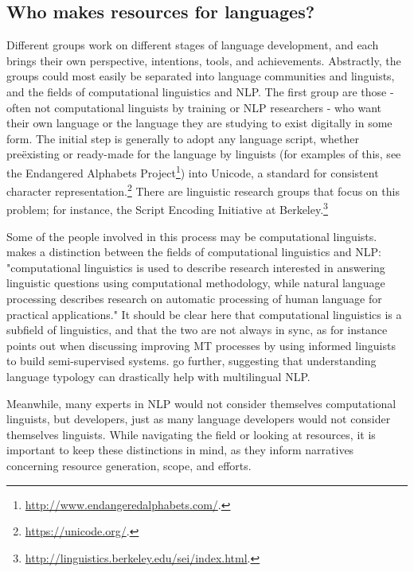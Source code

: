 \subsection{Who makes resources for languages?}
\label{subsec:who-makes-resources}

Different groups  work on different stages of language development, and each brings their own perspective, intentions, tools, and achievements. Abstractly, the groups could most easily be separated into language communities and linguists, and the fields of computational linguistics and NLP. The first group are those - often not computational linguists by training or NLP researchers - who want their own language or the language they are studying to exist digitally in some form. The initial step is generally to adopt any language script, whether  pre\"{e}xisting or ready-made for the language by linguists (for examples of this, see the Endangered Alphabets Project\footnote{\href{http://www.endangeredalphabets.com/}{http://www.endangeredalphabets.com/}. }) into Unicode, a standard for consistent character representation.\footnote{\href{https://unicode.org/}{https://unicode.org/}. } There are linguistic research groups that focus on this problem; for instance, the Script Encoding Initiative at Berkeley.\footnote{\href{http://linguistics.berkeley.edu/sei/index.html}{http://linguistics.berkeley.edu/sei/index.html}. }

Some of the people involved in this process may be computational linguists. \citet{bender2016linguistic} makes a distinction between the fields of computational linguistics and NLP: "computational linguistics is used to describe research interested in answering linguistic questions using computational methodology, while natural language processing describes research on automatic processing of human language for practical applications." It should be clear here that computational linguistics is a subfield of linguistics, and that the two are not always in sync, as for instance \citet{kay1997proper} points out when discussing improving MT processes by using informed linguists to build semi-supervised systems. \citet{bender2010grand, bender2016linguistic} go further, suggesting that understanding language typology can drastically help with multilingual NLP.

Meanwhile, many experts in NLP would not consider themselves computational linguists, but developers, just as many language developers would not consider themselves linguists. While navigating the field or looking at resources, it is important to keep these distinctions in mind, as they inform narratives concerning resource generation, scope, and efforts.

